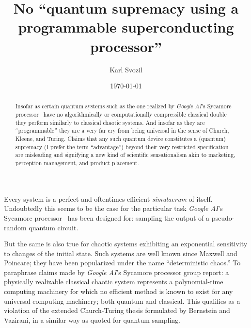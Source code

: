 \documentclass[%
   preprint,
 showpacs,
 showkeys,
 preprintnumbers,
 amsmath,amssymb,
 aps,
  pra,
 ]{revtex4-1}
\begin{document}
\title{No ``quantum supremacy using a programmable superconducting processor''}


\author{Karl Svozil}




\date{\today}

\begin{abstract}
Insofar as certain quantum systems such as the one realized by {\it Google AI}'s Sycamore processor~\cite{Arute2019} have no algorithmically or computationally compressible classical double they perform similarly to classical chaotic systems. And insofar as they are ``programmable'' they are a very far cry from being universal in the sense of Church, Kleene, and Turing. Claims that any such quantum device constitutes a (quantum) supremacy (I prefer the term ``advantage'') beyond their very restricted specification are misleading and signifying a new kind of scientific sensationalism akin to marketing, perception management, and product placement.
\end{abstract}




\maketitle

Every system is a perfect and oftentimes efficient {\em simulacrum} of itself.
Undoubtedly this seems to be the case for the particular task {\it Google AI}'s Sycamore processor~\cite{Arute2019}
has been designed for: sampling the output of a pseudo-random quantum circuit.

But the same is also true for chaotic systems exhibiting an exponential sensitivity to changes of the initial state.
Such systems are well known since Maxwell and Poincare;
they have been popularized under the name ``deterministic chaos.''
To paraphrase claims made by {\it Google AI}'s Sycamore processor group report:
a physically realizable classical chaotic system represents a polynomial-time computing machinery
for which no efficient method is known to exist for any universal computing machinery; both quantum and classical.
This qualifies as a violation of the extended Church-Turing thesis formulated by Bernstein and Vazirani,
in a similar way as quoted for quantum sampling.
\end{document}
